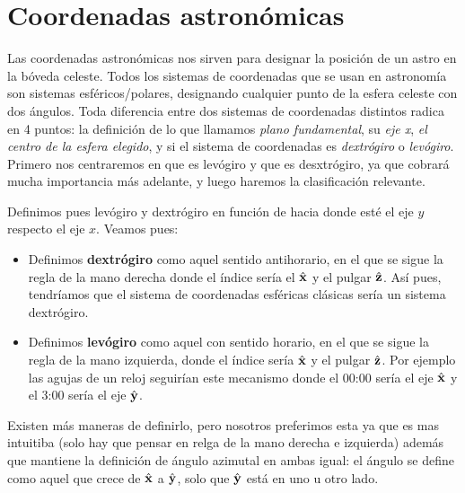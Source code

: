 
\section{Coordenadas astronómicas}

Las coordenadas astronómicas nos sirven para designar la posición de un astro en la bóveda celeste. Todos los sistemas de coordenadas que se usan en astronomía son sistemas esféricos/polares, designando cualquier punto de la esfera celeste con dos ángulos. Toda diferencia entre dos sistemas de coordenadas distintos radica en 4 puntos: la definición de lo que llamamos \textit{plano fundamental}, su \textit{eje x}, \textit{el centro de la esfera elegido}, y si el sistema de coordenadas es \textit{dextrógiro} o \textit{levógiro}. Primero nos centraremos en que es levógiro y que es desxtrógiro, ya que cobrará mucha importancia más adelante, y luego haremos la clasificación relevante. 


Definimos pues levógiro y dextrógiro en función de hacia donde esté el eje $y$ respecto el eje $x$. Veamos pues: 

\begin{itemize}
	\item Definimos \textbf{dextrógiro} como aquel sentido antihorario, en el que se sigue la regla de la mano derecha donde el índice sería el $\hat{\mathbf{x}}$ y el pulgar $\hat{\mathbf{z}}$. Así pues, tendríamos que el sistema de coordenadas esféricas clásicas sería un sistema dextrógiro. 
	\item Definimos \textbf{levógiro} como aquel con sentido horario, en el que se sigue la regla de la mano izquierda, donde el índice sería $\hat{\mathbf{x}}$ y el pulgar $\hat{\mathbf{z}}$. Por ejemplo las agujas de un reloj seguirían este mecanismo donde el 00:00 sería el eje $\hat{\mathbf{x}}$ y el 3:00 sería el eje $\hat{\mathbf{y}}$. 
\end{itemize}
Existen más maneras de definirlo, pero nosotros preferimos esta ya que es mas intuitiba (solo hay que pensar en relga de la mano derecha e izquierda) además que mantiene la definición de ángulo azimutal en ambas igual: el ángulo se define como aquel que crece de $\hat{\mathbf{x}}$ a $\hat{\mathbf{y}}$, solo que $\hat{\mathbf{y}}$ está en uno u otro lado. 

